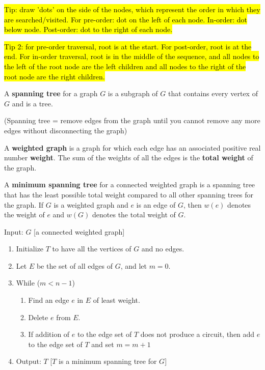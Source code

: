 \documentclass{article}
\begin{document}
\begin{description}
	\item \qquad \hl{Tip: draw 'dots' on the side of the nodes, which represent the order in which they are searched/visited. For pre-order: dot on the left of each node. In-order: dot below node. Post-order: dot to the right of each node.}
	\item \qquad \hl{Tip 2: for pre-order traversal, root is at the start. For post-order, root is at the end. For in-order traversal, root is in the middle of the sequence, and all nodes to the left of the root node are the left children and all nodes to the right of the root node are the right children.}
	\item[Spanning Tree]A \textbf{spanning tree} for a graph $G$ is a subgraph of $G$ that contains every vertex of $G$ and is a tree. 
	\item \qquad (Spanning tree = remove edges from the graph until you cannot remove any more edges without disconnecting the graph)
    \item[Weighted Graph]A \textbf{weighted graph} is a graph for which each edge has an associated positive real number \textbf{weight}. The sum of the weights of all the edges is the \textbf{total weight} of the graph. 
    \item[Minimum Spanning Tree]A \textbf{minimum spanning tree} for a connected weighted graph is a spanning tree that has the least possible total weight compared to all other spanning trees for the graph. If $G$ is a weighted graph and $e$ is an edge of $G$, then $w(e)$ denotes the weight of $e$ and $w(G)$ denotes the total weight of $G$.
    \item[\ding{73} Kruskal's Algorithm for MST] Input: $G$ [a connected weighted graph]
    \begin{enumerate}
    	\item Initialize $T$ to have all the vertices of $G$ and no edges.
		\item Let $E$ be the set of all edges of $G$, and let $m = 0$.
		\item While ($m < n - 1$)
		\begin{enumerate}
			\item Find an edge $e$ in $E$ of least weight.
			\item Delete $e$ from $E$.
			\item If addition of $e$ to the edge set of $T$ does not produce a circuit, then add $e$ to the edge set of $T$ and set $m = m + 1$
		\end{enumerate}
		\item Output: $T$ [$T$ is a minimum spanning tree for $G$]

\end{enumerate}
\end{description}
\end{document}
